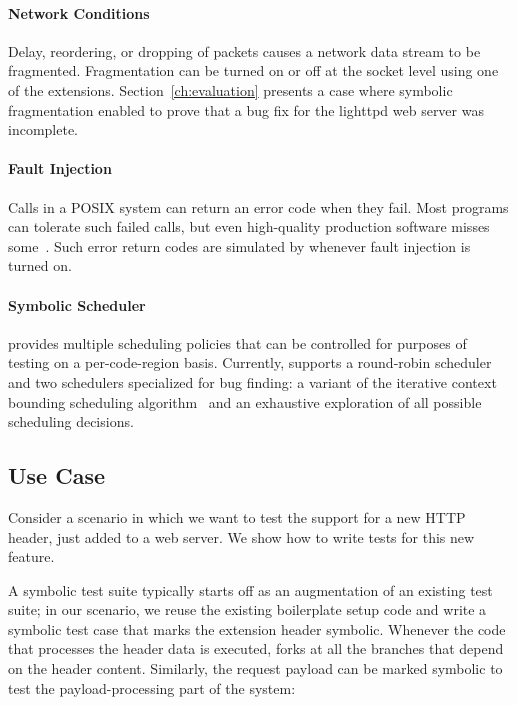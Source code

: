 \paragraph{Network Conditions} Delay, reordering, or dropping of packets causes a network data stream to be fragmented.  Fragmentation can be turned on or off at the socket level using one of the \cnine {} extensions.  Section~\ref{ch:evaluation} presents a case where symbolic fragmentation enabled \cnine to prove that a bug fix for the lighttpd web server was incomplete. 

\paragraph{Fault Injection} Calls in a POSIX system can return an error code when they fail. Most programs can tolerate such failed calls, but even high-quality production software misses some~\cite{lfi}. Such error return codes are simulated by \cnine whenever fault injection is turned on. 

\paragraph{Symbolic Scheduler} \cnine provides multiple scheduling policies that can be controlled for purposes of testing on a per-code-region basis.  Currently, \cnine supports a round-robin scheduler and two schedulers specialized for bug finding: a variant of the iterative context bounding scheduling algorithm~\cite{chess} and an exhaustive exploration of all possible scheduling decisions.  


\subsection{Use Case}

Consider a scenario in which we want to test the support for a new  HTTP header, just added to a web server. We show how to write tests for this new feature. 

A symbolic test suite typically starts off as an augmentation of an existing test suite; in our scenario, we reuse the existing boilerplate setup code and write a symbolic test case that marks the extension header symbolic. Whenever the code that processes the header data is executed, \cnine forks at all the branches that depend on the header content. Similarly, the request payload can be marked symbolic to test the payload-processing part of the system:

